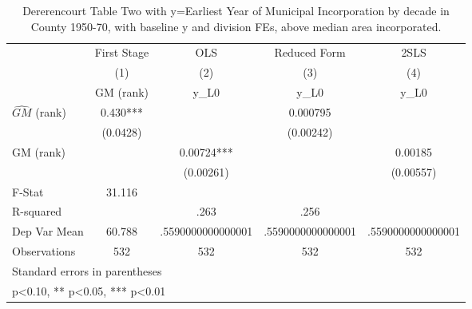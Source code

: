 \begin{table}[htbp]\centering
\def\sym#1{\ifmmode^{#1}\else\(^{#1}\)\fi}
\caption{Dererencourt Table Two with y=Earliest Year of Municipal Incorporation by decade in County 1950-70, with baseline y and division FEs, above median area incorporated.}
\begin{tabular}{l*{4}{c}}
\toprule
                    & First Stage   &         OLS   &Reduced Form   &        2SLS   \\
                    &\multicolumn{1}{c}{(1)}&\multicolumn{1}{c}{(2)}&\multicolumn{1}{c}{(3)}&\multicolumn{1}{c}{(4)}\\
                    &\multicolumn{1}{c}{GM  (rank)}&\multicolumn{1}{c}{y\_L0}&\multicolumn{1}{c}{y\_L0}&\multicolumn{1}{c}{y\_L0}\\
\midrule
$\hat{GM}$ (rank)   &       0.430***&               &    0.000795   &               \\
                    &    (0.0428)   &               &   (0.00242)   &               \\
\addlinespace
GM  (rank)          &               &     0.00724***&               &     0.00185   \\
                    &               &   (0.00261)   &               &   (0.00557)   \\
\midrule
F-Stat              &      31.116   &               &               &               \\
R-squared           &               &        .263   &        .256   &               \\
Dep Var Mean        &      60.788   &.5590000000000001   &.5590000000000001   &.5590000000000001   \\
Observations        &         532   &         532   &         532   &         532   \\
\bottomrule
\multicolumn{5}{l}{\footnotesize Standard errors in parentheses}\\
\multicolumn{5}{l}{\footnotesize * p<0.10, ** p<0.05, *** p<0.01}\\
\end{tabular}
\end{table}
